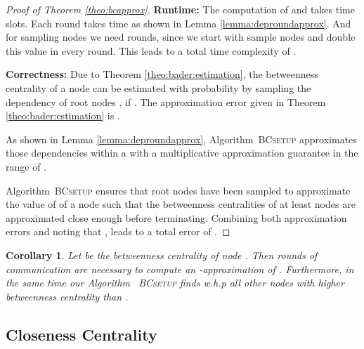 \documentclass[11pt]{article}
\newtheorem{corollary}[theorem]{Corollary}
\newcommand{\todoI}[1]{}\newcommand{\blueI}[1]{}
\newif\iffull
\begin{document}
\begin{proof}[Proof of Theorem \ref{theo:bcapprox}]
\textbf{Runtime: }
The computation of  and  \iffull in Lines \ref{line:BCestimstart} to \ref{line:BCestimend}\fi takes  time slots.
Each round takes  time as shown in Lemma \ref{lemma:deproundapprox}. And for sampling  nodes we need  rounds, since we start with  sample nodes and double this value in every round. This leads to a total time complexity of .

\textbf{Correctness: }Due to Theorem \ref{theo:bader:estimation}, the betweenness centrality  of a node  can be estimated with probability  by sampling the dependency  of  root nodes , if .
The approximation error given in Theorem \ref{theo:bader:estimation} is .

As shown in Lemma \ref{lemma:deproundapprox}, Algorithm\iffull~\ref{alg:BC_setup_controlling}\fi~\textsc{BCsetup} approximates those dependencies  within a with a multiplicative approximation guarantee in the range of . 
\iffull In Line \ref{line:BCcheck} and \ref{line:BCnhatcheck}, \fi
Algorithm\iffull~\ref{alg:BC_setup_controlling}\fi~\textsc{BCsetup} ensures that  root nodes have been sampled to approximate the value of  of a node  such that the betweenness centralities of at least  nodes are approximated close enough before terminating.
Combining both approximation errors and noting that , leads to a total error of .
\end{proof}

\begin{corollary}
Let  be the betweenness centrality of node . Then  rounds of communication are necessary to compute an -approximation of . Furthermore, in the same time our Algorithm \iffull~\ref{alg:BC_setup_controlling}\fi~\textsc{BCsetup} finds  w.h.p all other nodes with higher betweenness centrality than .
\end{corollary}
\fi 




\subsection{Closeness Centrality}
\label{sec:CC}

\todoI{It is mentioned in \cite{aggarwal2010survey} that a modification of \cite{rattigan2007graph} chooses landmarks using local closeness centrality - can we do that, too?}\blueI{I dont know. Didnt read it}
\end{document}
